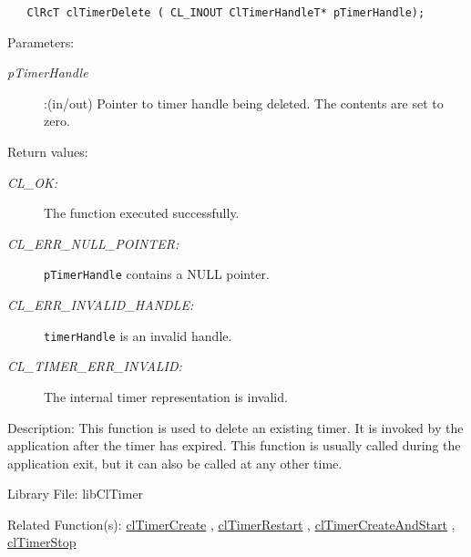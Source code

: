 \begin{flushleft}
\begin{Desc}
\footnotesize\begin{verbatim}   ClRcT clTimerDelete ( CL_INOUT ClTimerHandleT* pTimerHandle);
\end{verbatim}
\normalsize
\end{Desc}
\begin{Desc}
\item[Parameters:]
\begin{description}
\item[{\em p\-Timer\-Handle}]:(in/out) Pointer to timer handle being deleted. The contents are set to zero.\end{description}
\end{Desc}
\begin{Desc}
\item[Return values:]
\begin{description}
\item[{\em CL\_\-OK:}]The function executed successfully. 
\item[{\em CL\_\-ERR\_\-NULL\_\-POINTER:}]{\tt{pTimerHandle}} contains a NULL pointer. 
\item[{\em CL\_\-ERR\_\-INVALID\_\-HANDLE:}]{\tt{timerHandle}} is an invalid handle. 
\item[{\em CL\_\-TIMER\_\-ERR\_\-INVALID:}]The internal timer representation is invalid.\end{description}
\end{Desc}
\begin{Desc}
\item[Description:]This function is used to delete an existing timer. It is invoked by the application after the timer has expired. This 
function is usually called during the application exit, but it can also be called at any other time.\end{Desc}
\begin{Desc}
\item[Library File:]lib\-Cl\-Timer\end{Desc}
\begin{Desc}
\item[Related Function(s):]\hyperlink{pagetmr104}{cl\-Timer\-Create} , \hyperlink{pagetmr109}{cl\-Timer\-Restart} , 
\hyperlink{pagetmr108}{cl\-Timer\-Create\-And\-Start} , \hyperlink{pagetmr107}{cl\-Timer\-Stop} \end{Desc}


\newpage


\end{flushleft}
